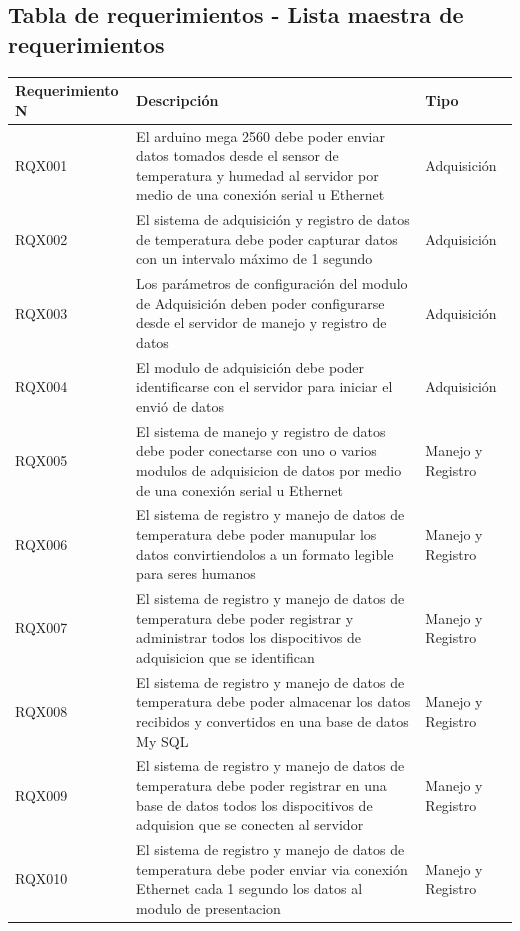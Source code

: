 \subsection{\textcolor[gray]{.2}{Tabla de requerimientos - Lista maestra de
requerimientos}} 
\begin{table}[h!]
\begin{center}
\begin{tabular}{|p{30mm}|p{70mm}|p{30mm}|}
\hline
\rowcolor[gray]{.8} Requerimiento N & Descripción & Tipo \\
\hline
RQX001 & El arduino mega 2560 debe poder enviar datos tomados desde el sensor
de temperatura y humedad al servidor por medio de una conexión serial  u
Ethernet & Adquisición\\
\hline
RQX002 & El sistema de adquisición y registro de datos de temperatura debe poder
capturar datos con un intervalo máximo de 1 segundo & Adquisición \\
\hline
RQX003 & Los parámetros de configuración del modulo de Adquisición deben poder
configurarse desde el servidor de manejo y registro de datos & Adquisición \\
\hline
RQX004 & El modulo de adquisición debe poder identificarse con el servidor para
iniciar el envió de datos & Adquisición \\
\hline
RQX005 & El sistema de manejo y registro de datos debe poder conectarse con uno
o varios modulos de adquisicion de datos por medio de una conexión serial u
Ethernet & Manejo y Registro \\
\hline
RQX006 & El sistema de registro y manejo de datos de temperatura debe poder
manupular los  datos convirtiendolos a un formato legible para seres humanos &
Manejo y Registro\\
\hline
RQX007 & El sistema de registro y manejo de datos de temperatura debe poder
registrar y administrar todos los dispocitivos de adquisicion que se identifican
& Manejo y Registro\\
\hline
RQX008 & El sistema de registro y manejo de datos de temperatura debe poder
almacenar los datos recibidos y convertidos en una base de datos My SQL & Manejo
y Registro\\
\hline
RQX009 & El sistema de registro y manejo de datos de temperatura debe poder
registrar en una base de datos todos los dispocitivos de adquision que se
conecten al servidor & Manejo y Registro \\
\hline
RQX010 & El sistema de registro y manejo de datos de temperatura debe poder 
enviar via conexión Ethernet cada 1 segundo los datos al modulo de presentacion
& Manejo y Registro\\
\hline
\end{tabular}
\end{center}
\end{table}

